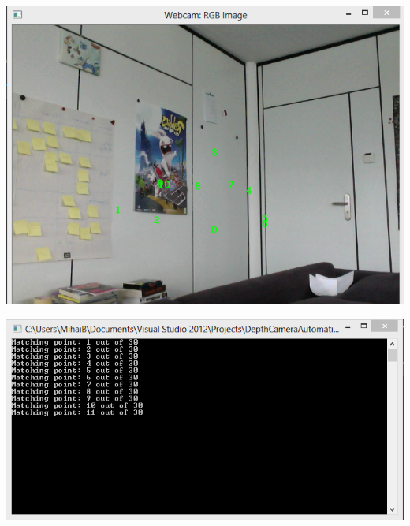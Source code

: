 \begin{center}
	\includegraphics[scale=0.8]{images/calibration_points.png}
\end{center}

\begin{center}
	\includegraphics[scale=0.7]{images/console.png}
\end{center}

